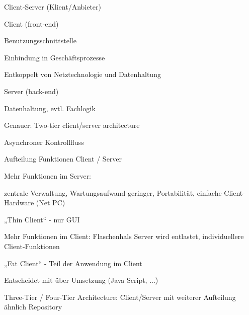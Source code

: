 \documentclass[a4paper]{article}
\begin{document}
\begin{multicols}{3}
  Client-Server (Klient/Anbieter)
  \begin{itemize*}
    \item Client (front-end)
          \begin{itemize*}
            \item Benutzungsschnittstelle
            \item Einbindung in Geschäftsprozesse
            \item Entkoppelt von Netztechnologie und Datenhaltung
          \end{itemize*}
    \item Server (back-end)
          \begin{itemize*}
            \item Datenhaltung, evtl. Fachlogik
          \end{itemize*}
    \item Genauer: Two-tier client/server architecture
    \item Asynchroner Kontrollfluss
    \item Aufteilung Funktionen Client / Server
          \begin{itemize*}
            \item Mehr Funktionen im Server:
                  \begin{itemize*}
                    \item zentrale Verwaltung, Wartungsaufwand geringer, Portabilität, einfache Client-Hardware (Net PC)
                    \item „Thin Client“ - nur GUI
                  \end{itemize*}
            \item Mehr Funktionen im Client: Flaschenhals Server wird entlastet, individuellere Client-Funktionen
                  \begin{itemize*}
                    \item „Fat Client“ - Teil der Anwendung im Client
                  \end{itemize*}
            \item Entscheidet mit über Umsetzung (Java Script, ...)
          \end{itemize*}
  \end{itemize*}

  Three-Tier / Four-Tier Architecture: Client/Server mit weiterer Aufteilung ähnlich Repository


\end{multicols}
\end{document}
